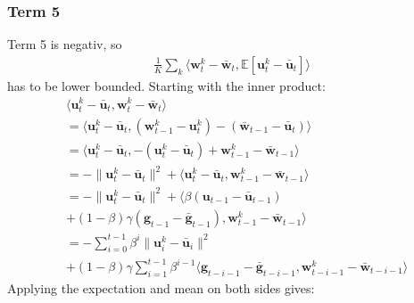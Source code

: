 \documentclass[10pt,twocolumn,letterpaper]{article}
\begin{document}
\subsubsection{Term 5}
Term 5 is negativ, so
\begin{align*}
    \frac{1}{K}\sum_k \langle \mathbf{w}_t^k - \bar{\mathbf{w}}_t, \mathbb{E}\left[\mathbf{u}_t^k - \bar{\mathbf{u}}_t\right] \rangle
\end{align*}
has to be lower bounded.
Starting with the inner product:
\begin{align*}
    &\langle \mathbf{u}_{t}^k - \bar{\mathbf{u}}_{t}, \mathbf{w}_{t}^k - \bar{\mathbf{w}}_{t} \rangle \\
    &= \langle \mathbf{u}_{t}^k - \bar{\mathbf{u}}_{t}, (\mathbf{w}_{t-1}^k - \mathbf{u}_{t}^k) - (\bar{\mathbf{w}}_{t-1} - \bar{\mathbf{u}}_{t}) \rangle \\
    &= \langle \mathbf{u}_{t}^k - \bar{\mathbf{u}}_{t}, -(\mathbf{u}_{t}^k - \bar{\mathbf{u}}_{t}) + \mathbf{w}_{t-1}^k - \bar{\mathbf{w}}_{t-1} \rangle  \\
    &= -\|\mathbf{u}_{t}^k - \bar{\mathbf{u}}_{t}\|^2 + \langle \mathbf{u}_{t}^k - \bar{\mathbf{u}}_{t}, \mathbf{w}_{t-1}^k - \bar{\mathbf{w}}_{t-1} \rangle \\
    &= -\|\mathbf{u}_{t}^k - \bar{\mathbf{u}}_{t}\|^2 + \langle \beta (\mathbf{u}_{t-1} - \bar{\mathbf{u}}_{t-1})
    \\&+ (1-\beta)\gamma (\mathbf{g}_{t-1} - \bar{\mathbf{g}}_{t-1}), \mathbf{w}_{t-1}^k - \bar{\mathbf{w}}_{t-1} \rangle \\
    &= -\sum_{i=0}^{t-1}\beta^i \|\mathbf{u}_{i}^k - \bar{\mathbf{u}}_{i}\|^2\\
    &+ (1-\beta)\gamma \sum_{i=1}^{t-1}\beta^{i-1}\langle \mathbf{g}_{t-i-1} - \bar{\mathbf{g}}_{t-i-1}, \mathbf{w}_{t-i-1}^k - \bar{\mathbf{w}}_{t-i-1} \rangle
\end{align*}
Applying the expectation and mean on both sides gives:
\end{document}
